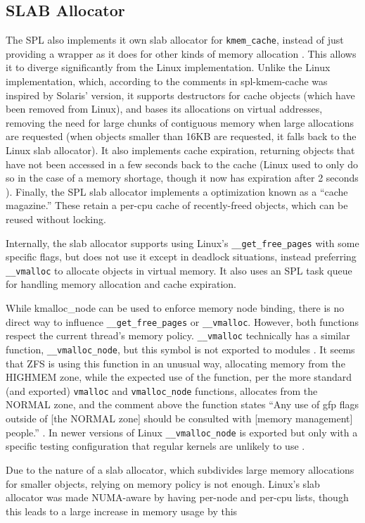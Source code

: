 \subsection{SLAB Allocator}
The SPL also implements it own slab allocator for  \texttt{kmem\_cache}, instead of just providing a wrapper as it does for other kinds of memory 
allocation \cite[{module/spl/spl-kmem-cache.c}]{zfs}. 
This allows it to diverge significantly from the Linux implementation.
Unlike the Linux implementation, which, according to the comments in spl-kmem-cache was inspired by Solaris' version, it supports destructors for cache
objects (which have been removed from Linux), and bases its allocations on virtual addresses, removing the need for large chunks of contiguous memory
when large allocations are requested (when objects smaller than 16KB are requested, it falls back to the Linux slab allocator).
It also implements cache expiration, returning objects that have not been accessed in a few seconds back to the cache 
(Linux used to only do so in the case of a memory shortage, though it now has expiration after 2 seconds \cite{lameter_slab_2014}).
Finally, the SPL slab allocator implements a optimization known as a ``cache magazine.''
These retain a per-cpu cache of recently-freed objects, which can be reused without locking.

Internally, the slab allocator supports using Linux's \texttt{\_\_get\_free\_pages} with some specific flags, 
but does not use it except in deadlock situations, instead preferring \texttt{\_\_vmalloc} to allocate objects in virtual memory.
It also uses an SPL task queue for handling memory allocation and cache expiration.

While kmalloc\_node can be used to enforce memory node binding, there is no direct way to influence \texttt{\_\_get\_free\_pages}
or \texttt{\_\_vmalloc}.
However, both functions respect the current thread's memory policy.
\texttt{\_\_vmalloc} technically has a similar function, \texttt{\_\_vmalloc\_node}, but this symbol is not exported to modules \cite[{mm/vmalloc.c}]{linux}.
It seems that ZFS is using this function in an unusual way, allocating memory from the HIGHMEM zone, while the expected use of the function, per the
more standard (and exported) \texttt{vmalloc} and \texttt{vmalloc\_node} functions, allocates from the NORMAL zone, and the comment above the function states 
``Any use of gfp flags outside of [the NORMAL zone] should be consulted with [memory management] people.'' \cite[{mm/vmalloc.c}]{linux}.
In newer versions of Linux \texttt{\_\_vmalloc\_node} is exported but only with a specific testing configuration that regular kernels are unlikely to use
\cite{newlinux}.

Due to the nature of a slab allocator, which subdivides large memory allocations for smaller objects,
relying on memory policy is not enough.
Linux's slab allocator was made NUMA-aware by having per-node and per-cpu lists, though this leads to a large increase in memory usage by this
